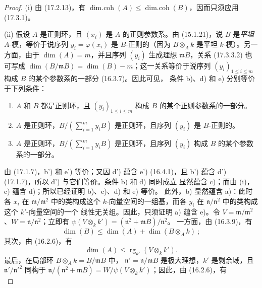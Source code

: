 \begin{proof}
\textnormal{(i)} 由 (17.2.13)，有
$\operatorname{dim.coh}(A)\leq\operatorname{dim.coh}(B)$，因而只须应用
(17.3.1)。

\textnormal{(ii)} 假设 $A$ 是正则环，且 $(x_i)$ 是 $A$ 的正则参数系。由
(15.1.21)，说 $B$ 是\emph{平坦} $A$-模，等价于说序列
$y_i=\varphi(x_i)$ 是 $B$-正则的（因为 $B\otimes_A k$ 是平坦
$k$-模）。另一方面，由于 $\dim(A)=m$，并且序列 $(y_i)$ 生成理想
$\mathfrak{m}B$，关系 (17.3.3.2) 也可写成
$\dim(B/\mathfrak{m}B)=\dim(B)-m$；这一关系等价于说序列
$(y_i)_{1\leq i\leq m}$ 构成 $B$ 的某个参数系的一部分 (16.3.7)。因此可见，
条件 b)、d) 和 e) 分别等价于下列条件：
\begin{enumerate}
  \item[\rm b')] $A$ 和 $B$ 都是正则环，且 $(y_i)_{1\leq i\leq m}$
  构成 $B$ 的某个正则参数系的一部分。
  \item[\rm d')] $A$ 是正则环，$B/(\sum_{i=1}^m y_iB)$ 是正则环，且序列
  $(y_i)$ 是 $B$-正则的。
  \item[\rm e')] $A$ 是正则环，$B/(\sum_{i=1}^m y_iB)$ 是正则环，且序列
  $(y_i)$ 构成 $B$ 的某个参数系的一部分。
\end{enumerate}
由 (17.1.7)，b') 和 e') 等价；又因 d') 蕴含 e') (16.4.1)，且 b') 蕴含
d') (17.1.7)，所以 d') 与它们等价。条件 b) 和 d) 同时成立
显然蕴含 c)；而由 (i)，c) 蕴含 d)；所以已经证明 b)、c)、d) 和 e) 等价。
此外，b) 显然蕴含 a)：此时各 $x_i$ 在
$\mathfrak{m}/\mathfrak{m}^2$ 中的类构成这个 $k$-向量空间的一组基，而各
$y_i$ 在 $\mathfrak{n}/\mathfrak{n}^2$ 中的类构成这个 $k'$-向量空间的一个
线性无关组。因此，只须证明 a) 蕴含 e)。令
$V=\mathfrak{m}/\mathfrak{m}^2$、$W=\mathfrak{n}/\mathfrak{n}^2$；立即有
$\psi(V\otimes_k k')=(\mathfrak{n}^2+\mathfrak{m}B)/\mathfrak{n}^2$。
一方面，由 (16.3.9)，有
\begin{equation}
\label{0.17.3.3.3-fr}
\tag{17.3.3.3}
  \dim(B)\leq\dim(A)+\dim(B\otimes_A k)~;
\end{equation}
其次，由 (16.2.6)，有
\begin{equation}
\label{0.17.3.3.4-fr}
\tag{17.3.3.4}
  \dim(A)\leq\operatorname{rg}_{k'}(V\otimes_k k').
\end{equation}
最后，在局部环 $B\otimes_A k=B/\mathfrak{m}B$ 中，
$\mathfrak{n}'=\mathfrak{n}/\mathfrak{m}B$ 是极大理想，$k'$ 是剩余域，且
$\mathfrak{n}'/\mathfrak{n}'^2$ 同构于
$\mathfrak{n}/(\mathfrak{n}^2+\mathfrak{m}B)
=W/\psi(V\otimes_k k')$；因此，由 (16.2.6)，有
\begin{equation}
\label{0.17.3.3.5-fr}

\end{equation}
\end{proof}
